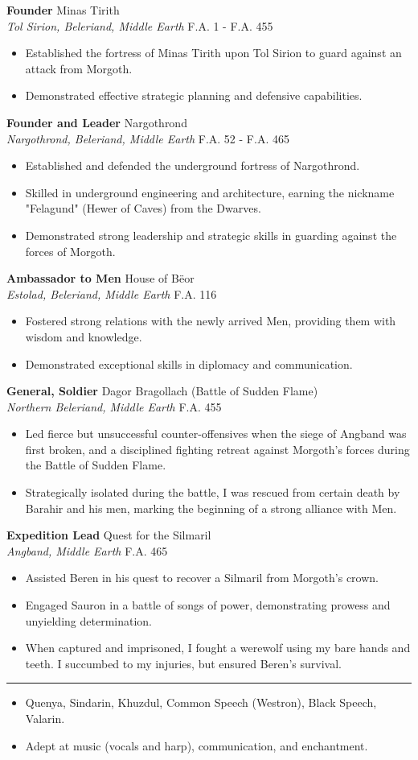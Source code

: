 \documentclass[a4paper, 10pt]{article}
\newcommand{\sectiontitle}[1]{
    \vspace{8pt}
    \footnotesize
    \noindent{\large \textbf{#1}}
    \vspace{3pt}
    \hrule
    \vspace{6pt}
}
\newcommand{\entry}[4]{
    \vspace{2pt}
    \footnotesize
    \noindent\textbf{#1} \hfill #2 \\
    \footnotesize
    \textit{#3} \hfill #4 \\
    \vspace{-9pt}
}
\begin{document}
\entry{Founder}{Minas Tirith}{Tol Sirion, Beleriand, Middle Earth}{F.A. 1 - F.A. 455}
\begin{itemize}[noitemsep, before=\small]
    \footnotesize
    \item Established the fortress of Minas Tirith upon Tol Sirion to guard against an attack from Morgoth.
    \item Demonstrated effective strategic planning and defensive capabilities.
\end{itemize}
\entry{Founder and Leader}{Nargothrond}{Nargothrond, Beleriand, Middle Earth}{F.A. 52 - F.A. 465}
\begin{itemize}[noitemsep, before=\small]
    \footnotesize
    \item Established and defended the underground fortress of Nargothrond.
    \item Skilled in underground engineering and architecture, earning the nickname "Felagund" (Hewer of Caves) from the Dwarves.
    \item Demonstrated strong leadership and strategic skills in guarding against the forces of Morgoth.
\end{itemize}

\entry{Ambassador to Men}{House of Bëor}{Estolad, Beleriand, Middle Earth}{F.A. 116}
\begin{itemize}[noitemsep, before=\small]
    \footnotesize
    \item Fostered strong relations with the newly arrived Men, providing them with wisdom and knowledge.
    \item Demonstrated exceptional skills in diplomacy and communication.
\end{itemize}

\entry{General, Soldier}{Dagor Bragollach (Battle of Sudden Flame)}{Northern Beleriand, Middle Earth}{F.A. 455}
\begin{itemize}[noitemsep, before=\small]
    \footnotesize
    \item Led fierce but unsuccessful counter-offensives when the siege of Angband was first broken, and a disciplined fighting retreat against Morgoth's forces during the Battle of Sudden Flame.
    \item Strategically isolated during the battle, I was rescued from certain death by Barahir and his men, marking the beginning of a strong alliance with Men.
\end{itemize}

\entry{Expedition Lead}{Quest for the Silmaril}{Angband, Middle Earth}{F.A. 465}
\begin{itemize}[noitemsep, before=\small]
    \footnotesize
    \item Assisted Beren in his quest to recover a Silmaril from Morgoth's crown.
    \item Engaged Sauron in a battle of songs of power, demonstrating prowess and unyielding determination.
    \item When captured and imprisoned, I fought a werewolf using my bare hands and teeth. I succumbed to my injuries, but ensured Beren's survival.
\end{itemize}

\sectiontitle{Languages and Interests}
\begin{itemize}[noitemsep]
    \footnotesize
    \item Quenya, Sindarin, Khuzdul, Common Speech (Westron), Black Speech, Valarin.
    \item Adept at music (vocals and harp), communication, and enchantment.
\end{itemize}
\end{document}
